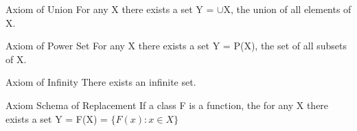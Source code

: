 \documentclass[10pt,a4paper]{article}
\begin{document}
\begin{axiom}{Axiom of Union}
	For any X there exists a set Y = $\cup$X, the union of all elements of X.
\end{axiom}

\begin{axiom}{Axiom of Power Set}
	For any X there exists a set Y = P(X), the set of all subsets of X.
\end{axiom}

\begin{axiom}{Axiom of Infinity}
	There exists an infinite set.
\end{axiom}

\begin{axiom}{Axiom Schema of Replacement}
	If a class F is a function, the for any X there exists a set Y = F(X) = $\lbrace F(x) : x \in X \rbrace$
\end{axiom}
\end{document}
